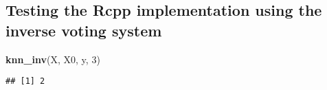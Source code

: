 \documentclass[]{article}
\newenvironment{Shaded}{\begin{snugshade}}{\end{snugshade}}
\newcommand{\DecValTok}[1]{\textcolor[rgb]{0.00,0.00,0.81}{#1}}
\newcommand{\KeywordTok}[1]{\textcolor[rgb]{0.13,0.29,0.53}{\textbf{#1}}}
\newcommand{\NormalTok}[1]{#1}
\begin{document}
\hypertarget{testing-the-rcpp-implementation-using-the-inverse-voting-system}{%
\subsection{Testing the Rcpp implementation using the inverse voting
system}\label{testing-the-rcpp-implementation-using-the-inverse-voting-system}}

\begin{Shaded}
\begin{Highlighting}[]
\KeywordTok{knn_inv}\NormalTok{(X, X0, y, }\DecValTok{3}\NormalTok{)}
\end{Highlighting}
\end{Shaded}

\begin{verbatim}
## [1] 2
\end{verbatim}
\end{document}
